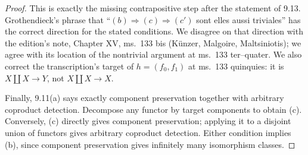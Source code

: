 \begin{proof}
This is exactly the missing contrapositive step after the statement
of 9.13.  Grothendieck's phrase that
``$(b)\Longrightarrow(c)\Longrightarrow(c')$ sont elles aussi triviales''
has the correct direction for the stated conditions.  We disagree on
that direction with the edition's note, Chapter XV, ms.~133 bis
(K\"unzer, Malgoire, Maltsiniotis); we agree with its location of the
nontrivial argument at ms.~133 ter--quater.  We also correct the
transcription's target of $h=(f_0,f_1)$ at ms.~133 quinquies:
it is $X\amalg X\to Y$, not $X\amalg X\to X$.

Finally, 9.11(a) says exactly component preservation together with
arbitrary coproduct detection.  Decompose any functor by target
components to obtain (c).  Conversely, (c) directly gives component
preservation; applying it to a disjoint union of functors gives
arbitrary coproduct detection.  Either condition implies (b), since
component preservation gives infinitely many isomorphism classes.
\end{proof}

